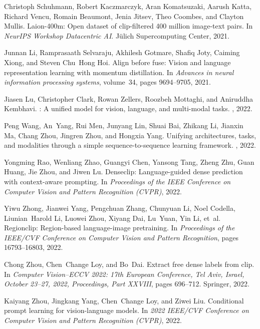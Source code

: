 \documentclass{article}
\begin{document}
{\begin{thebibliography}{10}
Christoph Schuhmann, Robert Kaczmarczyk, Aran Komatsuzaki, Aarush Katta,
  Richard Vencu, Romain Beaumont, Jenia Jitsev, Theo Coombes, and Clayton
  Mullis.
\newblock Laion-400m: Open dataset of clip-filtered 400 million image-text
  pairs.
\newblock In {\em NeurIPS Workshop Datacentric AI}. J{\"u}lich Supercomputing
  Center, 2021.

Junnan Li, Ramprasaath Selvaraju, Akhilesh Gotmare, Shafiq Joty, Caiming Xiong,
  and Steven Chu~Hong Hoi.
\newblock Align before fuse: Vision and language representation learning with
  momentum distillation.
\newblock In {\em Advances in neural information processing systems},
  volume~34, pages 9694--9705, 2021.

Jiasen Lu, Christopher Clark, Rowan Zellers, Roozbeh Mottaghi, and Aniruddha
  Kembhavi.
: A unified model for vision, language, and multi-modal
  tasks.
, 2022.

Peng Wang, An~Yang, Rui Men, Junyang Lin, Shuai Bai, Zhikang Li, Jianxin Ma,
  Chang Zhou, Jingren Zhou, and Hongxia Yang.
\newblock Unifying architectures, tasks, and modalities through a simple
  sequence-to-sequence learning framework.
, 2022.

Yongming Rao, Wenliang Zhao, Guangyi Chen, Yansong Tang, Zheng Zhu, Guan Huang,
  Jie Zhou, and Jiwen Lu.
\newblock Denseclip: Language-guided dense prediction with context-aware
  prompting.
\newblock In {\em Proceedings of the IEEE Conference on Computer Vision and
  Pattern Recognition (CVPR)}, 2022.

Yiwu Zhong, Jianwei Yang, Pengchuan Zhang, Chunyuan Li, Noel Codella,
  Liunian~Harold Li, Luowei Zhou, Xiyang Dai, Lu~Yuan, Yin Li, et~al.
\newblock Regionclip: Region-based language-image pretraining.
\newblock In {\em Proceedings of the IEEE/CVF Conference on Computer Vision and
  Pattern Recognition}, pages 16793--16803, 2022.

Chong Zhou, Chen~Change Loy, and Bo~Dai.
\newblock Extract free dense labels from clip.
\newblock In {\em Computer Vision--ECCV 2022: 17th European Conference, Tel
  Aviv, Israel, October 23--27, 2022, Proceedings, Part XXVIII}, pages
  696--712. Springer, 2022.

Kaiyang Zhou, Jingkang Yang, Chen~Change Loy, and Ziwei Liu.
\newblock Conditional prompt learning for vision-language models.
\newblock In {\em 2022 {IEEE}/{CVF} Conference on Computer Vision and Pattern
  Recognition ({CVPR})}, 2022.


\end{thebibliography}}
\end{document}
